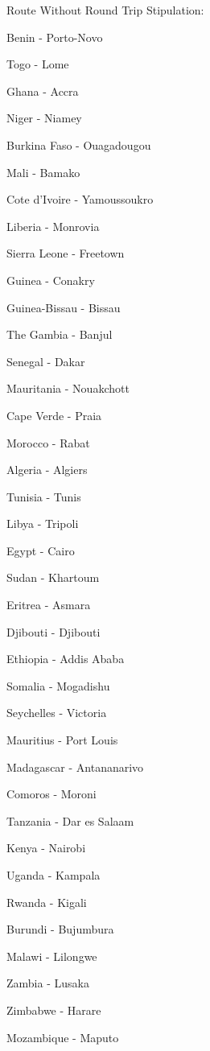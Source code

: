 \documentclass[12pt]{article}
\begin{document}
Route Without Round Trip Stipulation:
\begin{multicols}{3}
\tiny\begin{enumerate*}
\item Benin - Porto-Novo
\item Togo - Lome
\item Ghana - Accra
\item Niger - Niamey
\item Burkina Faso - Ouagadougou
\item Mali - Bamako
\item Cote d'Ivoire - Yamoussoukro
\item Liberia - Monrovia
\item Sierra Leone - Freetown
\item Guinea - Conakry
\item Guinea-Bissau - Bissau
\item The Gambia - Banjul
\item Senegal - Dakar
\item Mauritania - Nouakchott
\item Cape Verde - Praia
\item Morocco - Rabat
\item Algeria - Algiers
\item Tunisia - Tunis
\item Libya - Tripoli
\item Egypt - Cairo
\item Sudan - Khartoum
\item Eritrea - Asmara
\item Djibouti - Djibouti
\item Ethiopia - Addis Ababa
\item Somalia - Mogadishu
\item Seychelles - Victoria
\item Mauritius - Port Louis
\item Madagascar - Antananarivo
\item Comoros - Moroni
\item Tanzania - Dar es Salaam
\item Kenya - Nairobi
\item Uganda - Kampala
\item Rwanda - Kigali
\item Burundi - Bujumbura
\item Malawi - Lilongwe
\item Zambia - Lusaka
\item Zimbabwe - Harare
\item Mozambique - Maputo

\end{enumerate*}
\end{multicols}
\end{document}
